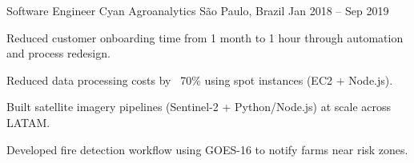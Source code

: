 \cventry
  {Software Engineer}
  {Cyan Agroanalytics}
  {São Paulo, Brazil}
  {Jan 2018 -- Sep 2019}
  {
    \begin{cvitems}
      \item {Reduced customer onboarding time from 1 month to 1 hour through automation and process redesign.}
      \item {Reduced data processing costs by ~70\% using spot instances (EC2 + Node.js).}
      \item {Built satellite imagery pipelines (Sentinel-2 + Python/Node.js) at scale across LATAM.}
      \item {Developed fire detection workflow using GOES-16 to notify farms near risk zones.}
    \end{cvitems}
    \bigskip
  }
